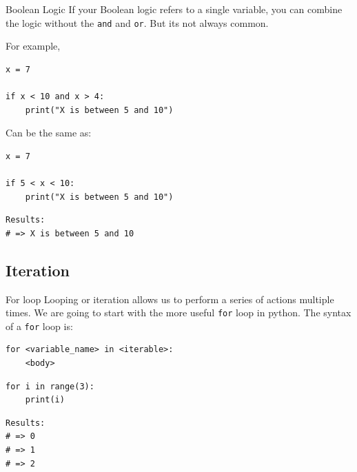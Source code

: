 \documentclass[10pt]{beamer}
\begin{document}
\begin{frame}[label={sec:orgc506e34},fragile]{Boolean Logic}
 If your Boolean logic refers to a single variable, you can combine the logic without
the \texttt{and} and \texttt{or}. But its not always common.

For example,

\begin{verbatim}
x = 7

if x < 10 and x > 4:
    print("X is between 5 and 10")
\end{verbatim}

Can be the same as:

\begin{verbatim}
x = 7

if 5 < x < 10:
    print("X is between 5 and 10")
\end{verbatim}

\begin{verbatim}
Results: 
# => X is between 5 and 10
\end{verbatim}
\end{frame}

\subsection{Iteration}
\label{sec:org4ba1966}

\begin{frame}[label={sec:orgfa3eecd},fragile]{For loop}
 Looping or iteration allows us to perform a series of actions multiple times. We are
going to start with the more useful \texttt{for} loop in python. The syntax of a \texttt{for} loop is:

\begin{verbatim}
for <variable_name> in <iterable>:
    <body>
\end{verbatim}

\begin{verbatim}
for i in range(3):
    print(i)
\end{verbatim}

\begin{verbatim}
Results: 
# => 0
# => 1
# => 2
\end{verbatim}
\end{frame}
\end{document}
